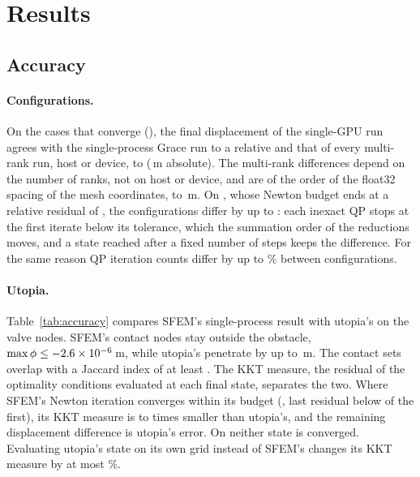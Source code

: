 \documentclass[sigconf,nonacm]{acmart}
\begin{document}
\section{Results}

\subsection{Accuracy}

\paragraph{Configurations.} On the cases that converge (\convergedCases{}), the final displacement
of the single-GPU run agrees with the single-process Grace run to a relative \agreeSerial{} and
that of every multi-rank run, host or device, to \agreeParallel{} (\agreeParallelAbs{}\,\si{\metre}
absolute). The multi-rank differences depend on the number of ranks, not on host or device, and
are of the order of the float32 spacing of the mesh coordinates, \coordUlp{} to
\coordUlpMax{}\,\si{\metre}. On \unconvergedCases{}, whose Newton budget ends at a relative
residual of \finalUnconverged{}, the configurations differ by up to \agreeUnconverged{}: each
inexact QP stops at the first iterate below its tolerance, which the summation order of the
reductions moves, and a state reached after a fixed number of steps keeps the difference. For the
same reason QP iteration counts differ by up to \qpSpreadMax\% between configurations.

\paragraph{Utopia.} Table~\ref{tab:accuracy} compares SFEM's single-process result with utopia's on
the valve nodes. SFEM's contact nodes stay outside the obstacle, $\max\phi \le \num{-2.6e-6}$\,\si{\metre},
while utopia's penetrate by up to \abPenUtopiaMax\,\si{\metre}. The contact sets overlap with a
Jaccard index of at least \abJaccardMin{}. The KKT measure, the residual of the optimality
conditions evaluated at each final state, separates the two. Where SFEM's Newton iteration
converges within its budget (\convergedCases{}, last residual below \convergedTol{} of the
first), its KKT measure is \kktRatioMin{} to \kktRatioMax{} times smaller than utopia's, and the
remaining displacement difference is utopia's error. On \unconvergedCases{} neither state is
converged. Evaluating utopia's state on its own grid instead of SFEM's changes its KKT measure by
at most \kktGridChange\%.
\end{document}
